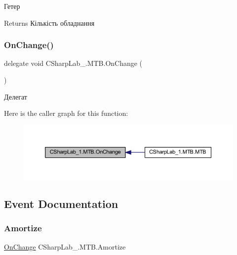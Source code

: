 Гетер 

\begin{DoxyReturn}{Returns}
Кількість обладнання
\end{DoxyReturn}
\hypertarget{class_c_sharp_lab__1_1_1_m_t_b_af571bf7359805b314bd1535dede971e2}{}\label{class_c_sharp_lab__1_1_1_m_t_b_af571bf7359805b314bd1535dede971e2} 
\subsubsection{\texorpdfstring{On\+Change()}{OnChange()}}
{\footnotesize\ttfamily delegate void C\+Sharp\+Lab\+\_.\+M\+T\+B.\+On\+Change (\begin{DoxyParamCaption}{ }\end{DoxyParamCaption})}



Делегат 

Here is the caller graph for this function\+:
\nopagebreak
\begin{figure}[H]
\begin{center}
\leavevmode
\includegraphics[width=350pt]{class_c_sharp_lab__1_1_1_m_t_b_af571bf7359805b314bd1535dede971e2_icgraph}
\end{center}
\end{figure}


\subsection{Event Documentation}
\hypertarget{class_c_sharp_lab__1_1_1_m_t_b_a7b0c9b5105656ce802a60a45128bde81}{}\label{class_c_sharp_lab__1_1_1_m_t_b_a7b0c9b5105656ce802a60a45128bde81} 
\subsubsection{\texorpdfstring{Amortize}{Amortize}}
{\footnotesize\ttfamily \hyperlink{class_c_sharp_lab__1_1_1_m_t_b_af571bf7359805b314bd1535dede971e2}{On\+Change} C\+Sharp\+Lab\+\_.\+M\+T\+B.\+Amortize}



